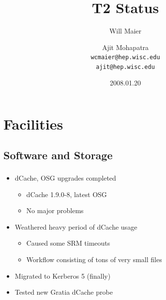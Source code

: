 \documentclass{beamer}
\title{T2 Status}
\author[Maier, Mohapatra]{
    Will Maier \and Ajit Mohapatra\\ 
    {\tt wcmaier@hep.wisc.edu}\\
    {\tt ajit@hep.wisc.edu}}
\institute[Wisconsin]{University of Wisconsin - High Energy Physics}
\date{2008.01.20}
\begin{document}
\begin{frame}
    \titlepage
\end{frame}


\section{Facilities}
\subsection{Software and Storage}
\begin{frame}
\frametitle{}
\begin{itemize}
    \item dCache, OSG upgrades completed
    \begin{itemize}
        \item dCache 1.9.0-8, latest OSG
        \item No major problems
    \end{itemize}
    \item Weathered heavy period of dCache usage
    \begin{itemize}
        \item Caused some SRM timeouts
        \item Workflow consisting of tons of very small files
    \end{itemize}
    \item Migrated to Kerberos 5 (finally)
    \item Tested new Gratia dCache probe
\end{itemize}
\end{frame}
\end{document}
